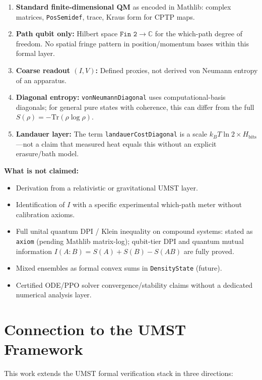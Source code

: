 \documentclass[11pt, a4paper]{article}
\begin{document}
\begin{enumerate}
\item \textbf{Standard finite-dimensional QM} as encoded in Mathlib: complex matrices, \texttt{PosSemidef}, trace, Kraus form for CPTP maps.
\item \textbf{Path qubit only:} Hilbert space $\texttt{Fin 2} \to \mathbb{C}$ for the which-path degree of freedom. No spatial fringe pattern in position/momentum bases within this formal layer.
\item \textbf{Coarse readout $(I, V)$:} Defined proxies, not derived von Neumann entropy of an apparatus.
\item \textbf{Diagonal entropy:} \texttt{vonNeumannDiagonal} uses computational-basis diagonals; for general pure states with coherence, this can differ from the full $S(\rho) = -\mathrm{Tr}(\rho \log \rho)$.
\item \textbf{Landauer layer:} The term \texttt{landauerCost\-Diagonal} is a scale $k_B T \ln 2 \times H_{\mathrm{bits}}$---not a claim that measured heat equals this without an explicit erasure/bath model.
\end{enumerate}

\noindent\textbf{What is not claimed:}
\begin{itemize}
\item Derivation from a relativistic or gravitational UMST layer.
\item Identification of $I$ with a specific experimental which-path meter without calibration axioms.
\item Full unital quantum DPI / Klein inequality on compound systems:
stated as \texttt{axiom} (pending Mathlib matrix-log); qubit-tier DPI and
quantum mutual information $I(A\!:\!B)=S(A)+S(B)-S(AB)$ are fully proved.
\item Mixed ensembles as formal convex sums in \texttt{DensityState} (future).
\item Certified ODE/PPO solver convergence/stability claims without a dedicated numerical analysis layer.
\end{itemize}

\section{Connection to the UMST Framework}

This work extends the UMST formal verification stack in three directions:
\end{document}
